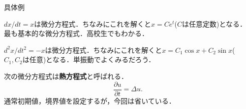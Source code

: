 \documentclass[dvipdfmx,aspectratio=141]{beamer}
\begin{document}
\begin{frame}{具体例}
    \begin{example}
        $dx/dt = x$は微分方程式．ちなみにこれを解くと$x=Ce^t$($C$は任意定数)となる．最も基本的な微分方程式．高校生でもわかる．
    \end{example}
    \begin{example}
        $d^2x/dt^2 = -x$は微分方程式．ちなみにこれを解くと$x = C_1\cos x + C_2\sin x$($C_1,C_2$は任意)となる．単振動でよくみるだろう．
    \end{example}
    \begin{example}
        次の微分方程式は\textbf{熱方程式}と呼ばれる．
        \[ \frac{\partial u}{\partial t} = \Delta u.\]
        通常初期値，境界値を設定するが，今回は省いている．
    \end{example}
\end{frame}
\end{document}
